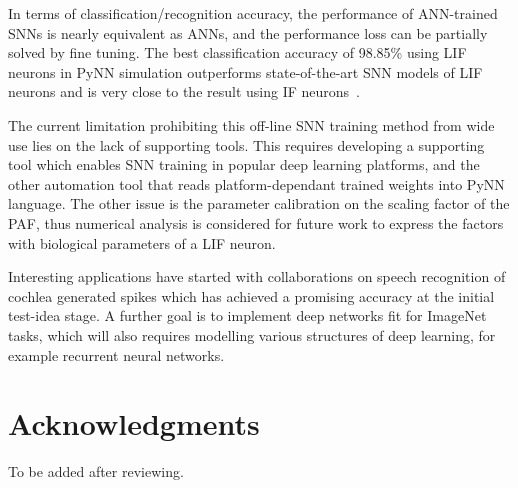 \documentclass{article}
\begin{document}
In terms of classification/recognition accuracy, the performance of ANN-trained SNNs is nearly equivalent as ANNs, and the performance loss can be partially solved by fine tuning.
The best classification accuracy of 98.85\% using LIF neurons in PyNN simulation outperforms state-of-the-art SNN models of LIF neurons and is very close to the result using IF neurons~\cite{diehl2015fast}.

The current limitation prohibiting this off-line SNN training method from wide use lies on the lack of supporting tools.
This requires developing a supporting tool which enables SNN training in popular deep learning platforms, and the other automation tool that reads platform-dependant trained weights into PyNN~\cite{davison2008pynn} language.
The other issue is the parameter calibration on the scaling factor of the PAF, thus numerical analysis is considered for future work to express the factors with biological parameters of a LIF neuron.

Interesting applications have started with collaborations on speech recognition of cochlea generated spikes which has achieved a promising accuracy at the initial test-idea stage.
A further goal is to implement deep networks fit for ImageNet~\cite{deng2009imagenet} tasks, which will also requires modelling various structures of deep learning, for example recurrent neural networks.

\section*{Acknowledgments}
To be added after reviewing.
\end{document}
